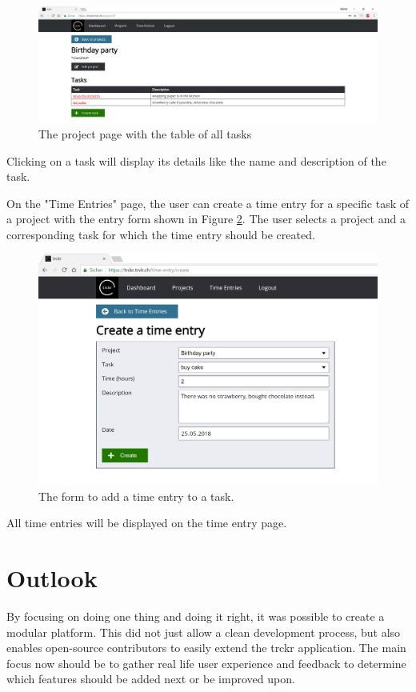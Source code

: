 \documentclass[bibliography=totoc, listof=totocnumbered]{scrartcl}
\begin{document}
\begin{figure}[h]
    \includegraphics[width=\textwidth]{trckr-project-page}
    \caption{The project page with the table of all tasks}
    \label{fig:trckr-project-page}
\end{figure}

Clicking on a task will display its details like the name and description of
the task.

On the "Time Entries" page, the user can create a time entry for a specific task
of a project with the entry form shown in Figure
\ref{fig:trckr-create-time-entry}. The user selects a project and a corresponding
task for which the time entry should be created.

\begin{figure}[h]
    \includegraphics[width=\textwidth]{trckr-create-time-entry}
    \caption{The form to add a time entry to a task.}
    \label{fig:trckr-create-time-entry}
\end{figure}

All time entries will be displayed on the time entry page.

\section{Outlook}
By focusing on doing one thing and doing it right, it was possible to create a
modular platform. This did not just allow a clean development process, but also
enables open-source contributors to easily extend the trckr application. The
main focus now should be to gather real life user experience and feedback to
determine which features should be added next or be improved upon.
\end{document}
